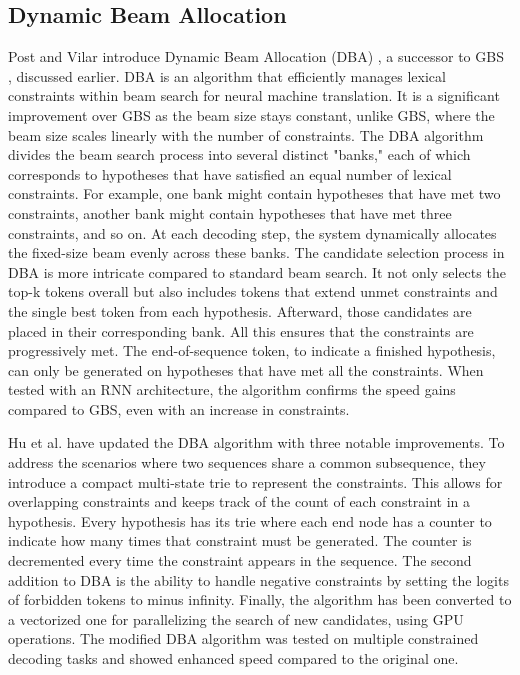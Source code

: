 \subsection{Dynamic Beam Allocation}
Post and Vilar introduce Dynamic Beam Allocation (DBA) \cite{post_fast_2018}, a successor to GBS \cite{hokamp_lexically_2017}, discussed earlier. DBA is an algorithm that efficiently manages lexical constraints within beam search for neural machine translation.  It is a significant improvement over GBS as the beam size stays constant, unlike GBS, where the beam size scales linearly with the number of constraints. The DBA algorithm divides the beam search process into several distinct "banks," each of which corresponds to hypotheses that have satisfied an equal number of lexical constraints. For example, one bank might contain hypotheses that have met two constraints, another bank might contain hypotheses that have met three constraints, and so on. At each decoding step, the system dynamically allocates the fixed-size beam evenly across these banks. The candidate selection process in DBA is more intricate compared to standard beam search. It not only selects the top-k tokens overall but also includes tokens that extend unmet constraints and the single best token from each hypothesis. Afterward, those candidates are placed in their corresponding bank. All this ensures that the constraints are progressively met. The end-of-sequence token, to indicate a finished hypothesis, can only be generated on hypotheses that have met all the constraints. When tested with an RNN architecture, the algorithm confirms the speed gains compared to GBS, even with an increase in constraints.
\newline\newline

Hu et al. \cite{hu_improved_2019} have updated the DBA algorithm with three notable improvements. To address the scenarios where two sequences share a common subsequence, they introduce a compact multi-state trie to represent the constraints. This allows for overlapping constraints and keeps track of the count of each constraint in a hypothesis. Every hypothesis has its trie where each end node has a counter to indicate how many times that constraint must be generated. The counter is decremented every time the constraint appears in the sequence. The second addition to DBA is the ability to handle negative constraints by setting the logits of forbidden tokens to minus infinity. Finally, the algorithm has been converted to a vectorized one for parallelizing the search of new candidates, using GPU operations. The modified DBA algorithm was tested on multiple constrained decoding tasks and showed enhanced speed compared to the original one.

